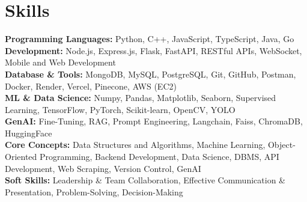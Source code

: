 \section{Skills}

\textbf{Programming Languages:} Python, C++, JavaScript, TypeScript, Java, Go \\
\textbf{Development:} Node.js, Express.js, Flask, FastAPI, RESTful APIs, WebSocket, Mobile and Web Development \\
\textbf{Database \& Tools:} MongoDB, MySQL, PostgreSQL, Git, GitHub, Postman, Docker, Render, Vercel, Pinecone, AWS (EC2) \\
\textbf{ML \& Data Science:} Numpy, Pandas, Matplotlib, Seaborn, Supervised Learning, TensorFlow, PyTorch, Scikit-learn, OpenCV, YOLO \\
\textbf{GenAI:} Fine-Tuning, RAG, Prompt Engineering, Langchain, Faiss, ChromaDB, HuggingFace \\
\textbf{Core Concepts:} Data Structures and Algorithms, Machine Learning, Object-Oriented Programming, Backend Development, Data Science, DBMS, API Development, Web Scraping, Version Control, GenAI \\
\textbf{Soft Skills:} Leadership \& Team Collaboration, Effective Communication \& Presentation, Problem-Solving, Decision-Making
